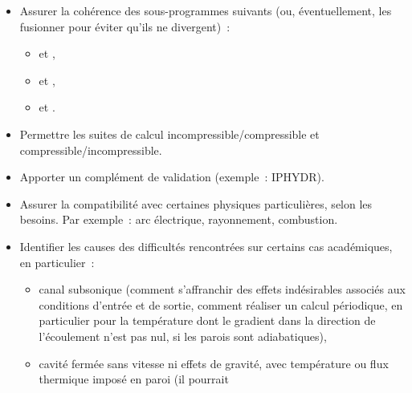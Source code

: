 \begin{itemize}
\item Assurer la coh\'erence des sous-programmes suivants (ou, \'eventuellement,
les fusionner pour \'eviter qu'ils ne divergent)~:
        \begin{itemize}
        \item {} et ,
        \item {} et ,
        \item {} et .
        \end{itemize}
\item Permettre les suites de calcul incompressible/compressible et
        compressible/incompressible.
\item Apporter un compl\'ement de validation (exemple~: IPHYDR).
\item Assurer la compatibilit\'e avec certaines physiques particuli\`eres, selon
        les besoins. Par exemple~: arc \'electrique, rayonnement, combustion.
\item Identifier les causes des difficult\'es rencontr\'ees sur certains cas
acad\'emiques, en particulier~:
        \begin{itemize}
        \item canal subsonique (comment s'affranchir des effets ind\'esirables
        associ\'es aux conditions d'entr\'ee et de sortie, comment r\'ealiser un
        calcul p\'eriodique, en particulier pour la temp\'erature dont le
        gradient dans la direction de l'\'ecoulement n'est pas nul, si
        les parois sont adiabatiques),
        \item cavit\'e ferm\'ee sans vitesse ni effets de gravit\'e,
        avec temp\'erature ou flux thermique impos\'e en paroi (il pourrait

\end{itemize}
\end{itemize}
